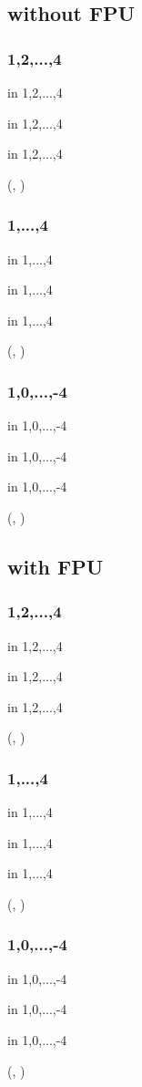 \documentclass{article}
\begin{document}
\newcommand\tests{%
\subsubsection{1,2,...,4}
\pgfplotsforeachungrouped \x in {1,2,...,4} {%
	\x

}

\pgfplotsforeachungrouped \x in {1,2,...,4} {%
	\pgfplotsforeachungrouped \y in {1,2,...,4} {%
		(\x,  \y)

	}%

}

\subsubsection{1,...,4}
\pgfplotsforeachungrouped \x in {1,...,4} {%
	\x

}

\pgfplotsforeachungrouped \x in {1,...,4} {%
	\pgfplotsforeachungrouped \y in {1,...,4} {%
		(\x,  \y)

	}%

}

\subsubsection{1,0,...,-4}
\pgfplotsforeachungrouped \x in {1,0,...,-4} {%
	\x

}

\pgfplotsforeachungrouped \x in {1,0,...,-4} {%
	\pgfplotsforeachungrouped \y in {1,0,...,-4} {%
		(\x,  \y)

	}%

}
}%

	\subsection{without FPU}
	{
		\tests
	}

	\subsection{with FPU}
	{
		\tests
	}
\end{document}
